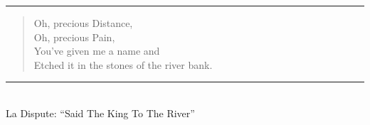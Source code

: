 \documentclass[a4paper, 12pt]{report}
\begin{document}
\hrule
{\Large\begin{quote}
    Oh, precious Distance,\\
    Oh, precious Pain,\\
    You’ve given me a name and\\
    Etched it in the stones of the river bank.
\end{quote}}
\hrule~\\
La Dispute: “Said The King To The River”
\end{document}
